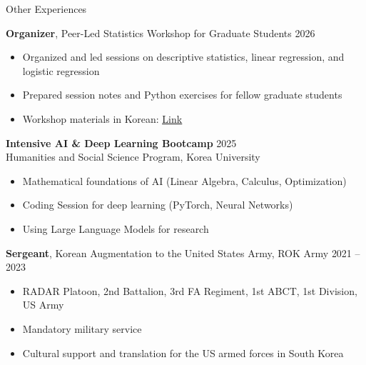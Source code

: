 \documentclass{resume} %
\begin{document}

\begin{rSection}{Other Experiences}

{\bf Organizer}{, Peer-Led Statistics Workshop for Graduate Students} \hfill {2026}
\begin{itemize}
  \item Organized and led sessions on descriptive statistics, linear regression, and logistic regression
  \item Prepared session notes and Python exercises for fellow graduate students
  \item Workshop materials in Korean: \href{https://drive.google.com/drive/folders/1xu6bPa2gu-HVmrbeXuiZJZ-ZOYxcVQFO?usp=sharing}{\underline{Link}}
\end{itemize}
\smallskip
{\bf Intensive AI \& Deep Learning Bootcamp} \hfill {2025}
\\ Humanities and Social Science Program, Korea University
\begin{itemize}
  \item Mathematical foundations of AI (Linear Algebra, Calculus, Optimization)
  \item Coding Session for deep learning (PyTorch, Neural Networks)
  \item Using Large Language Models for research
\end{itemize}
\smallskip
{\bf Sergeant}{, Korean Augmentation to the United States Army, ROK Army} \hfill {2021 -- 2023}
\begin{itemize}
  \item RADAR Platoon, 2nd Battalion, 3rd FA Regiment, 1st ABCT, 1st Division, US Army
  \item Mandatory military service
  \item Cultural support and translation for the US armed forces in South Korea
\end{itemize}

\end{rSection}
\end{document}
